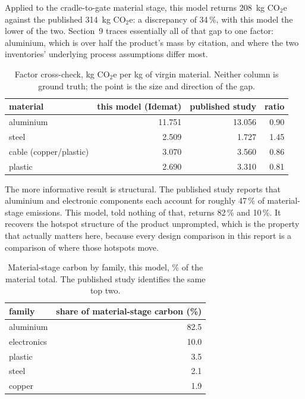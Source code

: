 \documentclass[11pt,a4paper]{article}
\begin{document}
Applied to the cradle-to-gate material stage, this model returns
\SI{208}{\kilo\gram} CO$_2$e against the published
\SI{314}{\kilo\gram} CO$_2$e: a discrepancy of 34\,\%, with
this model the lower of the two. Section~9 traces essentially all of that gap
to one factor: aluminium, which is over half the product's mass by
citation, and where the two inventories' underlying process assumptions
differ most.

\begin{table}[h]
\centering\small
\caption{Factor cross-check, \si{\kilo\gram} CO$_2$e per \si{\kilo\gram}
of virgin material. Neither column is ground truth; the point is the size and
direction of the gap.}
\label{tab:validation}
\begin{tabular}{lrrr}
\toprule
material & this model (Idemat) & published study & ratio \\
\midrule
aluminium & 11.751 & 13.056 & 0.90 \\
steel & 2.509 & 1.727 & 1.45 \\
cable (copper/plastic) & 3.070 & 3.560 & 0.86 \\
plastic & 2.690 & 3.310 & 0.81 \\
\bottomrule
\end{tabular}
\end{table}

The more informative result is structural. The published study reports that
aluminium and electronic components each account for roughly 47\,\% of
material-stage emissions. This model, told nothing of that, returns
82\,\% and 10\,\%. It recovers the hotspot structure of the
product unprompted, which is the property that actually matters here,
because every design comparison in this report is a comparison of where those
hotspots move.

\begin{table}[h]
\centering\small
\caption{Material-stage carbon by family, this model, \% of the material
total. The published study identifies the same top two.}
\begin{tabular}{lr}
\toprule
family & share of material-stage carbon (\%) \\
\midrule
aluminium & 82.5 \\
electronics & 10.0 \\
plastic & 3.5 \\
steel & 2.1 \\
copper & 1.9 \\
\bottomrule
\end{tabular}
\end{table}
\end{document}
